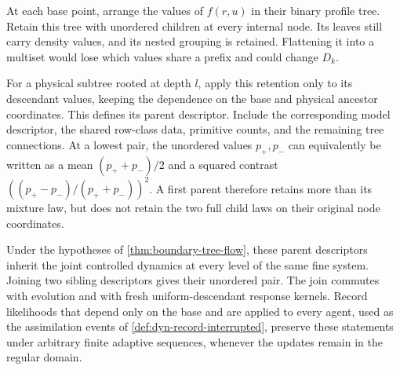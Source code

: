 At each base point, arrange the values of $f(r,u)$ in their binary profile tree. Retain this tree with unordered children at every internal node. Its leaves still carry density values, and its nested grouping is retained. Flattening it into a multiset would lose which values share a prefix and could change $D_k$.

For a physical subtree rooted at depth $l$, apply this retention only to its descendant values, keeping the dependence on the base and physical ancestor coordinates. This defines its parent descriptor. Include the corresponding model descriptor, the shared row-class data, primitive counts, and the remaining tree connections. At a lowest pair, the unordered values $p_+,p_-$ can equivalently be written as a mean $(p_++p_-)/2$ and a squared contrast $((p_+-p_-)/(p_++p_-))^2$. A first parent therefore retains more than its mixture law, but does not retain the two full child laws on their original node coordinates.

Under the hypotheses of \cref{thm:boundary-tree-flow}, these parent descriptors inherit the joint controlled dynamics at every level of the same fine system. Joining two sibling descriptors gives their unordered pair. The join commutes with evolution and with fresh uniform-descendant response kernels. Record likelihoods that depend only on the base and are applied to every agent, used as the assimilation events of \cref{def:dyn-record-interrupted}, preserve these statements under arbitrary finite adaptive sequences, whenever the updates remain in the regular domain.

